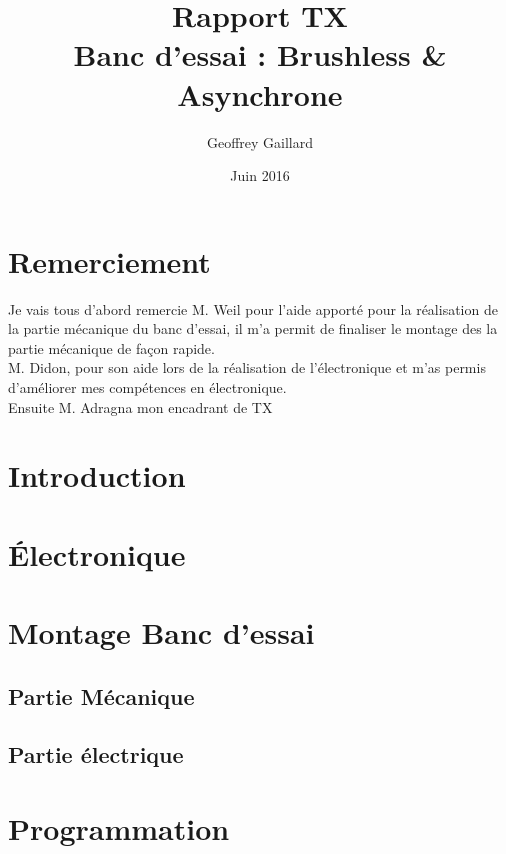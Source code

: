 \documentclass[11pt]{article}
\title{Rapport TX \\ Banc d'essai : Brushless \& Asynchrone}
\author{Geoffrey Gaillard}
\date{Juin 2016}
\begin{document}
\maketitle
\thispagestyle{empty}
\newpage

\thispagestyle{empty}
\tableofcontents{}
\newpage

\setcounter{page}{1}

\section{Remerciement}

Je vais tous d'abord remercie M. Weil pour l'aide apporté pour la réalisation de la partie mécanique du banc d'essai, il m'a permit de finaliser le montage des la partie mécanique de façon rapide.\\
M. Didon, pour son aide lors de la réalisation de l'électronique et m'as permis d'améliorer mes compétences en électronique.\\
Ensuite M. Adragna mon encadrant de TX 

\section{Introduction}
\section{Électronique}
\section{Montage Banc d'essai}
\subsection{Partie Mécanique}
\subsection{Partie électrique}
\section{Programmation}
\end{document}
